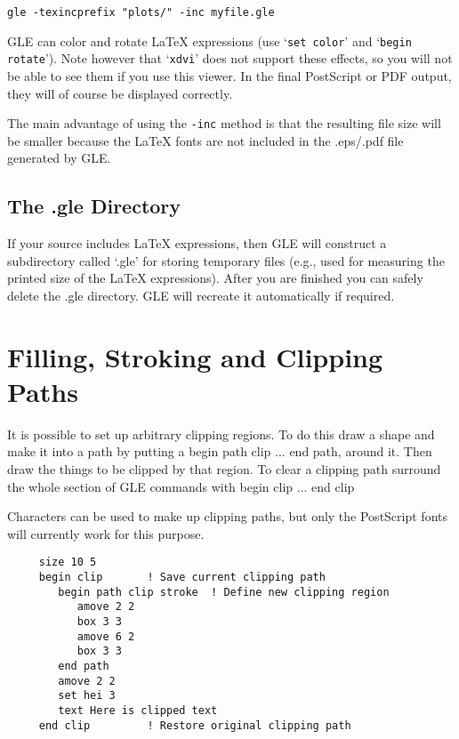 \begin{verbatim}
gle -texincprefix "plots/" -inc myfile.gle
\end{verbatim}

GLE can color and rotate \LaTeX{} expressions (use `\texttt{set color}' and `\texttt{begin rotate}'). Note however that `\texttt{xdvi}' does not support these effects, so you will not be able to see them if you use this viewer. In the final PostScript or PDF output, they will of course be displayed correctly.

The main advantage of using the \texttt{-inc} method is that the resulting file size will be smaller because the \LaTeX{} fonts are not included in the .eps/.pdf file generated by GLE.

\subsection{The .gle Directory}

If your source includes \LaTeX{} expressions, then GLE will construct a subdirectory called `.gle' for storing temporary files (e.g., used for measuring the printed size of the \LaTeX{} expressions). After you are finished you can safely delete the .gle directory. GLE will recreate it automatically if required.

\section{Filling, Stroking and Clipping Paths}
\label{clip:sec}
It is possible to set up arbitrary clipping regions.  To do
this draw a shape and make it into a path by putting 
a {\sf begin path clip} ... {\sf end path},  around it.  Then draw the things to 
be clipped by that region.  To clear a clipping path 
surround the whole section of GLE commands with  {\sf begin clip ... end clip}

	Characters can be used to make up clipping paths, but only the
PostScript fonts will currently work for this purpose.

\begin{verbatim}
     size 10 5 
     begin clip       ! Save current clipping path
        begin path clip stroke  ! Define new clipping region
           amove 2 2 
           box 3 3 
           amove 6 2 
           box 3 3 
        end path
        amove 2 2 
        set hei 3
        text Here is clipped text
     end clip         ! Restore original clipping path
\end{verbatim}

